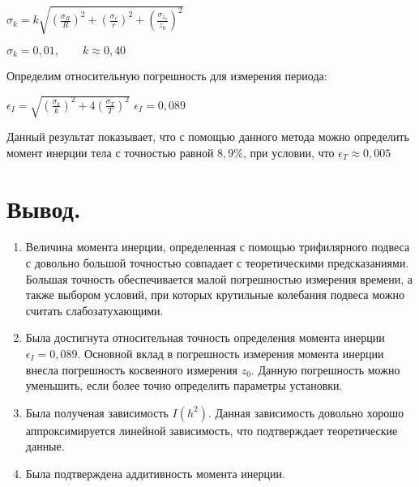 \documentclass[12pt,a4paper]{article}
\begin{document}
		\begin{flushleft}
			\begin{spacing}{1.6}
				$ \sigma_{k} = k\sqrt{\left(\frac{\sigma_{R}}{R}\right)^2 + \left(\frac{\sigma_{r}}{r}\right)^2 + \left(\frac{\sigma_{z_{0}}}{z_{0}}\right)^2} $

				$ \sigma_{k} = 0,01,\qquad k \approx 0,40$
			\end{spacing}
		\end{flushleft}

		Определим относительную погрешность для измерения периода:
		\begin{flushleft}
			\begin{spacing}{1.6}
				$ \epsilon_{I} = \sqrt{\left(\frac{\sigma_{k}}{k}\right)^2 + 4\left(\frac{\sigma_{T}}{T}\right)^2} $
				$ \epsilon_{I} = 0,089 $
			\end{spacing}
		\end{flushleft}

		 Данный результат показывает, что с помощью данного метода можно определить момент инерции тела с точностью равной  $8,9\%$, при условии, что $\epsilon_{T} \approx 0,005$

		\newpage

\section{Вывод.}
	\begin{enumerate}
		\item Величина момента инерции, определенная с помощью трифилярного подвеса с довольно большой точностью совпадает с теоретическими предсказаниями. Большая точность обеспечивается малой погрешностью измерения времени, а также выбором условий, при которых крутильные колебания подвеса можно считать слабозатухающими.
		\item Была достигнута относительная точность определения момента инерции $ \epsilon_{I} = 0,089 $. Основной вклад в погрешность измерения момента инерции внесла погрешность косвенного измерения $z_{0}$. Данную погрешность можно уменьшить, если более точно определить параметры установки.
		\item Была полученая зависимость $ I(h^{2}) $. Данная зависимость довольно хорошо аппроксимируется линейной зависимость, что подтверждает теоретические данные.
		\item Была подтверждена аддитивность момента инерции.
	\end{enumerate}
\end{document}

